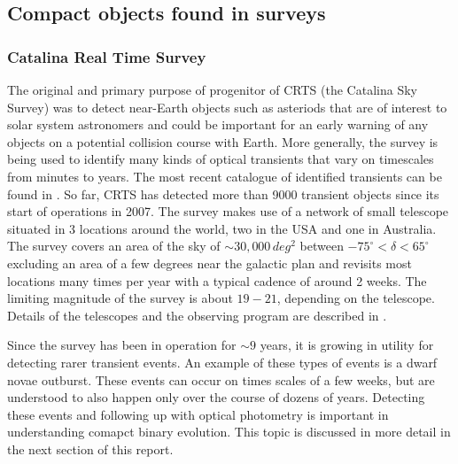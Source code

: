 \documentclass[a4paper,fleqn,usenatbib]{mnras}
\begin{document}
\subsection{Compact objects found in surveys}

\subsubsection{Catalina Real Time Survey}
The original and primary purpose of progenitor of CRTS (the Catalina Sky Survey) was to detect near-Earth objects such as asteriods that are of interest to solar system astronomers and could be important for an early warning of any objects on a potential collision course with Earth. More generally, the survey is being used to identify many kinds of optical transients that vary on timescales from minutes to years. The most recent catalogue of identified transients can be found in \citet{CatalinaCatalog}. So far, CRTS has detected more than 9000 transient objects since its start of operations in 2007. The survey makes use of a network of  small telescope situated in 3 locations around the world, two in the USA and one in Australia. The survey covers an area of the sky of $\sim 30,000\,deg^2$ between $-75^\circ < \delta < 65^\circ$ excluding an area of a few degrees near the galactic plan and revisits most locations many times per year with a typical cadence of around 2 weeks. The limiting magnitude of the survey is about $19-21$, depending on the telescope. Details of the telescopes and the observing program are described in \citet{Drake2009}. 

Since the survey has been in operation for $\sim 9$ years, it is growing in utility for detecting rarer transient events. An example of these types of events is a dwarf novae outburst. These events can occur on times scales of a few weeks, but are understood to also happen only over the course of dozens of years. Detecting these events and following up with optical photometry is important in understanding comapct binary evolution. This topic is discussed in more detail in the next section of this report. 
\end{document}
